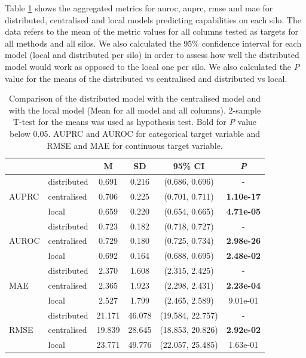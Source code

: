 
Table \ref{tab:allvsall} shows the aggregated metrics for \ac{auroc}, \ac{auprc}, \ac{rmse} and \ac{mae} for distributed, centralised and local models predicting capabilities on each silo. The data refers to the mean of the metric values for all columns tested as targets for all methods and all silos. We also calculated the 95\% confidence interval for each model (local and distributed per silo) in order to assess how well the distributed model would work as opposed to the local one per silo. We also calculated the \textit{P} value for the means of the distributed vs centralised and distributed vs local.

\begin{table}[h!] 
 \setlength{\tabcolsep}{7pt} %
 \renewcommand{\arraystretch}{1.3} %
  \captionsetup{justification=centering} 
\centering
\caption[Metrics for centralised model, distributed model and local model]{Comparison of the distributed model with the centralised model and with the local model (Mean for all model and all columns). 2-sample T-test for the means was used as hypothesis test. Bold for \textit{P} value below 0.05. AUPRC and AUROC for categorical target variable and RMSE and MAE for continuous target variable.}

\label{tab:allvsall}
\begin{tabular}{llcccc}
\toprule
 &  & M & SD & 95\% CI & \textit{P}  \\
\midrule
\multirow{3}{*}{AUPRC}
 & distributed & 0.691 & 0.216 & (0.686, 0.696) & - \\
  & centralised & 0.706 & 0.225 & (0.701, 0.711) & \bfseries 1.10e-17 \\
 & local & 0.659 & 0.220 & (0.654, 0.665) & \bfseries 4.71e-05 \\
 \hline

\multirow{3}{*}{AUROC} 
 & distributed & 0.723 & 0.182 & (0.718, 0.727) & - \\
 & centralised & 0.729 & 0.180 & (0.725, 0.734) & \bfseries 2.98e-26 \\
 & local & 0.692 & 0.164 & (0.688, 0.695) & \bfseries 2.48e-02 \\

\hline

\multirow{3}{*}{MAE} 
 & distributed & 2.370 & 1.608 & (2.315, 2.425) & - \\
 & centralised & 2.365 & 1.923 & (2.298, 2.431) & \bfseries 2.23e-04 \\
 & local & 2.527 & 1.799 & (2.465, 2.589) & 9.01e-01 \\

\hline

\multirow{3}{*}{RMSE} 
 & distributed & 21.171 & 46.078 & (19.584, 22.757) & - \\
 & centralised & 19.839 & 28.645 & (18.853, 20.826) & \bfseries 2.92e-02 \\
 & local & 23.771 & 49.776 & (22.057, 25.485) & 1.63e-01 \\
\hline
\end{tabular}
\end{table}
